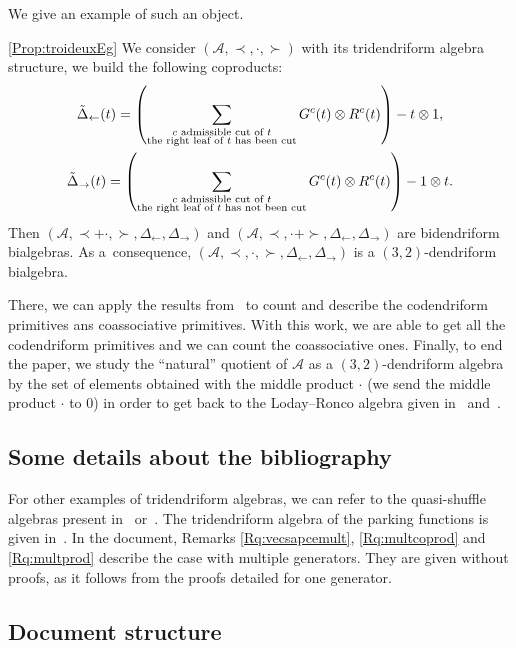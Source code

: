 \documentclass[10pt,a4paper]{amsart}
\numberwithin{equation}{section}
\theoremstyle{definition}
\theoremstyle{plain}
\begin{document}
We give an example of such an object.
\begin{customprop}{\ref{Prop:troideuxEg}}
	We consider $(\mathcal{A},\prec,\cdot,\succ)$ with its tridendriform algebra structure, we build the following coproducts:
	\begin{gather*}
		\tilde{\Delta}_{\leftarrow}(t)=\left(\sum_{\substack{\text{\rm $c$ admissible cut of $t$} \\ \text{\rm the right leaf of $t$ has been cut}}} G^c(t)\otimes R^c(t)\right)-t\otimes 1, \\
		\tilde{\Delta}_{\rightarrow}(t)=\left(\sum_{\substack{\text{\rm $c$ admissible cut of $t$} \\ \text{\rm the right leaf of $t$ has not been cut}}} G^c(t)\otimes R^c(t)\right)-1\otimes t.
	\end{gather*}
Then $(\mathcal{A},\prec+\cdot,\succ,\Delta_{\leftarrow},\Delta_{\rightarrow})$ and $(\mathcal{A},\prec,\cdot+\succ,\Delta_{\leftarrow},\Delta_{\rightarrow})$ are bidendriform bialgebras. As a~consequence, $(\mathcal{A},\prec,\cdot,\succ,\Delta_{\leftarrow},\Delta_{\rightarrow})$ is a $(3,2)$-dendriform bialgebra.
\end{customprop}
There, we can apply the results from~\cite{bidend} to count and describe the codendriform primitives ans coassociative primitives. With this work, we are able to get all the codendriform primitives and we can count the coassociative ones. Finally, to end the paper, we study the ``natural'' quotient of $\mathcal{A}$ as a $(3,2)$-dendriform algebra by the set of elements obtained with the middle product $\cdot$ (we send the middle product $\cdot$ to $0$) in order to get back to the Loday--Ronco algebra given in~\cite{LR} and~\cite{AgLR}.

\subsection*{Some details about the bibliography}

 For other examples of tridendriform algebras, we can refer to the quasi-shuffle algebras present in~\cite{batc2, batc} or~\cite{batc3}. The tridendriform algebra of the parking functions is given in~\cite{Tridend}.
 In the document, Remarks \ref{Rq:vecsapcemult}, \ref{Rq:multcoprod} and \ref{Rq:multprod} describe the case with multiple generators. They are given without proofs, as it follows from the proofs detailed for one generator.

\subsection*{Document structure}
\end{document}
